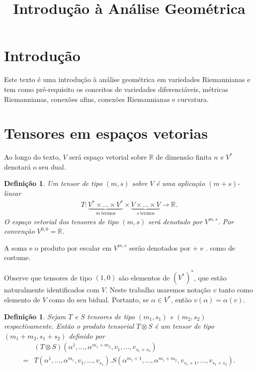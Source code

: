 \documentclass[10pt,reqno]{amsart}
\title{Introdução à Análise Geométrica}
\newtheorem{definition}[theorem]{Definição}
\begin{document}
\maketitle


\section{Introdução}

Este texto é uma introdução à análise geométrica em variedades Riemannianas e tem como pré-requisito os conceitos de variedades diferenciáveis, métricas Riemannianas, conexões afins, conexões Riemannianas e curvatura.

\section{Tensores em espaços vetorias}

Ao longo do texto, $V$ será espaço vetorial sobre $\mathbb R$ de dimensão finita $n$ e $V^\ast$ denotará o seu dual.

\begin{definition}
\label{Tensores sobre V}
Um tensor de tipo $(m,s)$ sobre $V$ é uma aplicação $(m+s)$-linear 
\begin{align*}
T: \underbrace{V^\ast \times \ldots \times V^\ast}_{m \ \mathrm{ termos}} \times \underbrace{ V \times \ldots \times V}_{s\  \mathrm{ termos}} \rightarrow \mathbb R. 
\end{align*} 
O espaço vetorial dos tensores de tipo $(m,s)$ será denotado por $V^{m,s}$. Por convenção $V^{0,0} = \mathbb R$.
\end{definition}

A soma e o produto por escalar em $V^{m,s}$ serão denotados por $+$ e $.$ como de costume.

Observe que tensores de tipo $(1,0)$ são elementos de $(V^\ast)^\ast$, que estão naturalmente identificados com $V$.
Neste trabalho usaremos notação $v$ tanto como elemento de $V$ como do seu bidual.
Portanto, se $\alpha \in V^\ast$, então $v (\alpha) = \alpha (v)$.

\begin{definition}
\label{Produto tensorial} Sejam $T$ e $S$ tensores de tipo $(m_1,s_1)$ e $(m_2,s_2)$ respectivamente. Então o produto tensorial $T \otimes S$ é um tensor de tipo $(m_1+m_2, s_1 + s_2)$ definido por
\begin{align*}
& (T \otimes S)(\alpha^1, \ldots, \alpha^{m_1 + m_2}, v_1, \ldots, v_{s_1+s_2}) \\
= & T(\alpha^1, \ldots, \alpha^{m_1}, v_1, \ldots, v_{s_1}).S(\alpha^{m_1+1}, \ldots, \alpha^{m_1+m_2}, v_{s_1+1}, \ldots, v_{s_1+s_2}).
\end{align*}
\end{definition}
\end{document}
